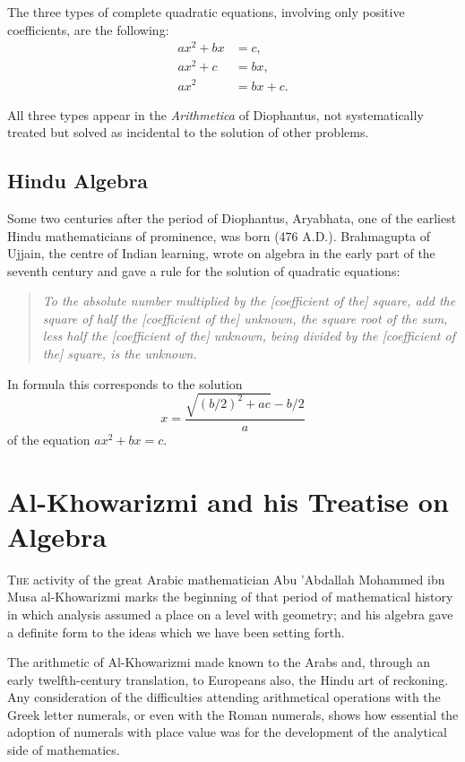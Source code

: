 \documentclass[11pt,a4paper]{book}
\begin{document}
The three types of complete quadratic equations, involving only positive coefficients, are the following:
\begin{align}
ax^2 + bx &= c,\\
ax^2 + c &= bx,\\
ax^2 &= bx + c.
\end{align}

All three types appear in the \textit{Arithmetica} of Diophantus, not systematically treated but solved as incidental to the solution of other problems.

\section{Hindu Algebra}

Some two centuries after the period of Diophantus, Aryabhata, one of the earliest Hindu mathematicians of prominence, was born (476 A.D.). Brahmagupta of Ujjain, the centre of Indian learning, wrote on algebra in the early part of the seventh century and gave a rule for the solution of quadratic equations:

\begin{quote}
\textit{To the absolute number multiplied by the [coefficient of the] square, add the square of half the [coefficient of the] unknown, the square root of the sum, less half the [coefficient of the] unknown, being divided by the [coefficient of the] square, is the unknown.}
\end{quote}

In formula this corresponds to the solution
\[x = \frac{\sqrt{(b/2)^2 + ac} - b/2}{a}\]
of the equation $ax^2 + bx = c$.

\chapter{Al-Khowarizmi and his Treatise on Algebra}

\lettrine[lines=3]{T}{he} activity of the great Arabic mathematician Abu 'Abdallah Mohammed ibn Musa al-Khowarizmi marks the beginning of that period of mathematical history in which analysis assumed a place on a level with geometry; and his algebra gave a definite form to the ideas which we have been setting forth.

The arithmetic of Al-Khowarizmi made known to the Arabs and, through an early twelfth-century translation, to Europeans also, the Hindu art of reckoning. Any consideration of the difficulties attending arithmetical operations with the Greek letter numerals, or even with the Roman numerals, shows how essential the adoption of numerals with place value was for the development of the analytical side of mathematics.
\end{document}
